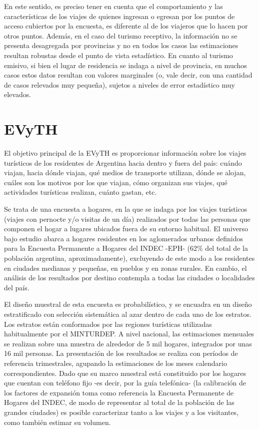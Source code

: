\documentclass[
]{book}
\begin{document}
En este sentido, es preciso tener en cuenta que el comportamiento y las características de los viajes de quienes ingresan o egresan por los puntos de acceso cubiertos por la encuesta, es diferente al de los viajeros que lo hacen por otros puntos. Además, en el caso del turismo receptivo, la información no se presenta desagregada por provincias y no en todos los casos las estimaciones resultan robustas desde el punto de vista estadístico. En cuanto al turismo emisivo, si bien el lugar de residencia se indaga a nivel de provincia, en muchos casos estos datos resultan con valores marginales (o, vale decir, con una cantidad de casos relevados muy pequeña), sujetos a niveles de error estadístico muy elevados.

\hypertarget{evyth}{%
\section{EVyTH}\label{evyth}}

El objetivo principal de la EVyTH es proporcionar información sobre los viajes turísticos de los residentes de Argentina hacia dentro y fuera del país: cuándo viajan, hacia dónde viajan, qué medios de transporte utilizan, dónde se alojan, cuáles son los motivos por los que viajan, cómo organizan sus viajes, qué actividades turísticas realizan, cuánto gastan, etc.

Se trata de una encuesta a hogares, en la que se indaga por los viajes turísticos (viajes con pernocte y/o visitas de un día) realizados por todas las personas que componen el hogar a lugares ubicados fuera de su entorno habitual. El universo bajo estudio abarca a hogares residentes en los aglomerados urbanos definidos para la Encuesta Permanente a Hogares del INDEC -EPH- (62\% del total de la población argentina, aproximadamente), excluyendo de este modo a los residentes en ciudades medianas y pequeñas, en pueblos y en zonas rurales. En cambio, el análisis de los resultados por destino contempla a todas las ciudades o localidades del país.

El diseño muestral de esta encuesta es probabilístico, y se encuadra en un diseño estratificado con selección sistemática al azar dentro de cada uno de los estratos. Los estratos están conformados por las regiones turísticas utilizadas habitualmente por el MINTURDEP. A nivel nacional, las estimaciones mensuales se realizan sobre una muestra de alrededor de 5 mil hogares, integrados por unas 16 mil personas. La presentación de los resultados se realiza con períodos de referencia trimestrales, agupando la estimaciones de los meses calendario correspondientes. Dado que su marco muestral está constituido por los hogares que cuentan con teléfono fijo -es decir, por la guía telefónica- (la calibración de los factores de expansión toma como referencia la Encuesta Permanente de Hogares del INDEC, de modo de representar al total de la población de las grandes ciudades) es posible caracterizar tanto a los viajes y a los visitantes, como también estimar su volumen.
\end{document}

